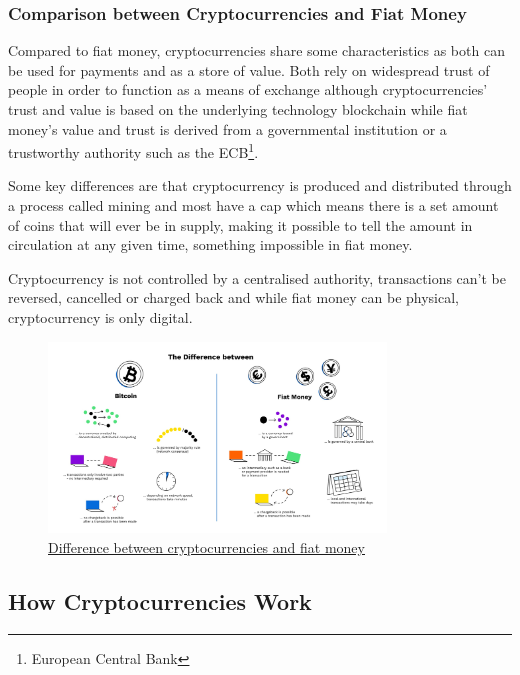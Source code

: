 \documentclass{article}
\newcommand\tab[1][1cm]{\hspace*{#1}}
\begin{document}
\subsubsection{Comparison between Cryptocurrencies and Fiat Money}

\tab Compared to fiat money, cryptocurrencies share some characteristics as both can be used for payments and as a store of value. Both rely on widespread trust of people in order to function as a means of exchange although cryptocurrencies' trust and value is based on the underlying technology blockchain while fiat money's value and trust is derived from a governmental institution or a trustworthy authority such as the ECB\footnote{European Central Bank}.

Some key differences are that cryptocurrency is  produced and distributed through a process called mining and most have a cap which means there is a set amount of coins that will ever be in supply, making it possible to tell the amount in circulation at any given time, something impossible in fiat money.
 
Cryptocurrency is not controlled by a centralised authority, transactions can’t be reversed, cancelled or charged back and while fiat money can be physical, cryptocurrency is only digital.

\begin{figure}[H]
    \begin{center}
        \includegraphics[width=0.8\textwidth]{images/cryptocurrencies_vs_fiat_money.jpeg}
        \caption{\href{https://bitpanda-academy.imgix.net/null94a7b99f-2399-48fa-a503-876e2ba6f2bf/Bitpanda-Infographics_2-bitcoin_fiat.png?auto=compress\%2Cformat&fit=min&fm=jpg&q=80&w=2100}{\underline{Difference between cryptocurrencies and fiat money}}}
    \end{center}
\end{figure}

\subsection{How Cryptocurrencies Work}
\end{document}
